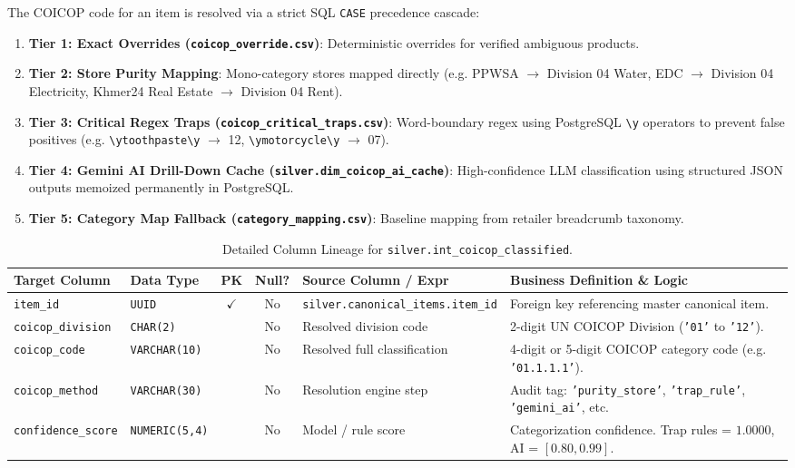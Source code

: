 \documentclass[a4paper, 11pt]{article}
\begin{document}
\begin{tcolorbox}[title=5-Tier Classification Resolution Precedence]
The COICOP code for an item is resolved via a strict SQL \texttt{CASE} precedence cascade:
\begin{enumerate}[leftmargin=*]
    \item \textbf{Tier 1: Exact Overrides (\texttt{coicop\_override.csv})}: Deterministic overrides for verified ambiguous products.
    \item \textbf{Tier 2: Store Purity Mapping}: Mono-category stores mapped directly (e.g. PPWSA $\to$ Division 04 Water, EDC $\to$ Division 04 Electricity, Khmer24 Real Estate $\to$ Division 04 Rent).
    \item \textbf{Tier 3: Critical Regex Traps (\texttt{coicop\_critical\_traps.csv})}: Word-boundary regex using PostgreSQL \texttt{\textbackslash y} operators to prevent false positives (e.g. \texttt{\textbackslash ytoothpaste\textbackslash y} $\to$ 12, \texttt{\textbackslash ymotorcycle\textbackslash y} $\to$ 07).
    \item \textbf{Tier 4: Gemini AI Drill-Down Cache (\texttt{silver.dim\_coicop\_ai\_cache})}: High-confidence LLM classification using structured JSON outputs memoized permanently in PostgreSQL.
    \item \textbf{Tier 5: Category Map Fallback (\texttt{category\_mapping.csv})}: Baseline mapping from retailer breadcrumb taxonomy.
\end{enumerate}
\end{tcolorbox}

\begin{table}[H]
\centering
\small
\begin{tabularx}{\textwidth}{l p{2.2cm} c c p{4.5cm} X}
\toprule
\textbf{Target Column} & \textbf{Data Type} & \textbf{PK} & \textbf{Null?} & \textbf{Source Column / Expr} & \textbf{Business Definition \& Logic} \\
\midrule
\texttt{item\_id} & \texttt{UUID} & $\checkmark$ & No & \texttt{silver.canonical\_items.item\_id} & Foreign key referencing master canonical item. \\
\texttt{coicop\_division} & \texttt{CHAR(2)} & & No & Resolved division code & 2-digit UN COICOP Division (\texttt{'01'} to \texttt{'12'}). \\
\texttt{coicop\_code} & \texttt{VARCHAR(10)} & & No & Resolved full classification & 4-digit or 5-digit COICOP category code (e.g. \texttt{'01.1.1.1'}). \\
\texttt{coicop\_method} & \texttt{VARCHAR(30)} & & No & Resolution engine step & Audit tag: \texttt{'purity\_store'}, \texttt{'trap\_rule'}, \texttt{'gemini\_ai'}, etc. \\
\texttt{confidence\_score} & \texttt{NUMERIC(5,4)} & & No & Model / rule score & Categorization confidence. Trap rules = $1.0000$, AI = $[0.80, 0.99]$. \\
\bottomrule
\end{tabularx}
\caption{Detailed Column Lineage for \texttt{silver.int\_coicop\_classified}.}
\end{table}
\end{document}
